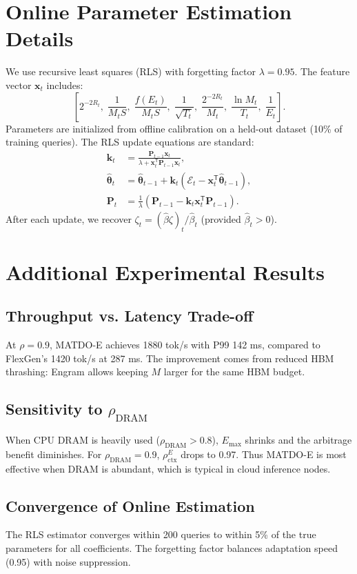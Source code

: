 \documentclass[11pt,a4paper]{article}
\theoremstyle{plain}
\theoremstyle{definition}
\begin{document}
\section{Online Parameter Estimation Details}
We use recursive least squares (RLS) with forgetting factor $\lambda=0.95$. The feature vector $\mathbf{x}_t$ includes:
\[
\left[2^{-2R_t},\; \frac{1}{M_t S},\; \frac{f(E_t)}{M_t S},\; \frac{1}{\sqrt{T_t}},\; \frac{2^{-2R_t}}{M_t},\; \frac{\ln M_t}{T_t},\; \frac{1}{E_t}\right].
\]
Parameters are initialized from offline calibration on a held-out dataset (10\% of training queries). The RLS update equations are standard:
\begin{align*}
\mathbf{k}_t &= \frac{\mathbf{P}_{t-1}\mathbf{x}_t}{\lambda + \mathbf{x}_t^{\mathsf{T}}\mathbf{P}_{t-1}\mathbf{x}_t},\\
\hat{\boldsymbol{\theta}}_t &= \hat{\boldsymbol{\theta}}_{t-1} + \mathbf{k}_t(\mathcal{E}_t - \mathbf{x}_t^{\mathsf{T}}\hat{\boldsymbol{\theta}}_{t-1}),\\
\mathbf{P}_t &= \frac{1}{\lambda}\left(\mathbf{P}_{t-1} - \mathbf{k}_t\mathbf{x}_t^{\mathsf{T}}\mathbf{P}_{t-1}\right).
\end{align*}
After each update, we recover $\zeta_t = (\hat{\beta}\zeta)_t / \hat{\beta}_t$ (provided $\hat{\beta}_t>0$).

\section{Additional Experimental Results}
\label{app:additional}
\subsection{Throughput vs. Latency Trade-off}
At $\rho=0.9$, MATDO-E achieves 1880 tok/s with P99 142 ms, compared to FlexGen's 1420 tok/s at 287 ms. The improvement comes from reduced HBM thrashing: Engram allows keeping $M$ larger for the same HBM budget.

\subsection{Sensitivity to $\rho_{\text{DRAM}}$}
When CPU DRAM is heavily used ($\rho_{\text{DRAM}}>0.8$), $E_{\max}$ shrinks and the arbitrage benefit diminishes. For $\rho_{\text{DRAM}}=0.9$, $\rho_{\text{ctx}}^E$ drops to 0.97. Thus MATDO-E is most effective when DRAM is abundant, which is typical in cloud inference nodes.

\subsection{Convergence of Online Estimation}
The RLS estimator converges within 200 queries to within 5\% of the true parameters for all coefficients. The forgetting factor balances adaptation speed (0.95) with noise suppression.
\end{document}
